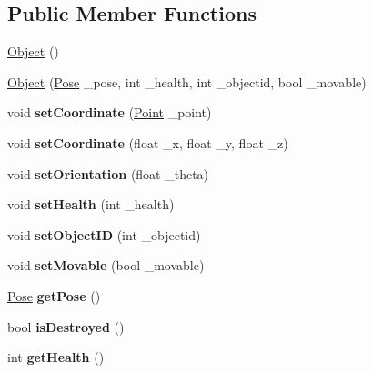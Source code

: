 \subsection*{Public Member Functions}
\begin{DoxyCompactItemize}
\item 
\hyperlink{class_object_a40860402e64d8008fb42329df7097cdb}{Object} ()
\item 
\hyperlink{class_object_a4fa29a635815662790df5caf339f2283}{Object} (\hyperlink{class_pose}{Pose} \_\-pose, int \_\-health, int \_\-objectid, bool \_\-movable)
\item 
\hypertarget{class_object_a9916c124808dd5327ee9db651999ee5e}{
void {\bfseries setCoordinate} (\hyperlink{class_point}{Point} \_\-point)}
\label{class_object_a9916c124808dd5327ee9db651999ee5e}

\item 
\hypertarget{class_object_aec5919a308227be70d7a830352dad309}{
void {\bfseries setCoordinate} (float \_\-x, float \_\-y, float \_\-z)}
\label{class_object_aec5919a308227be70d7a830352dad309}

\item 
\hypertarget{class_object_a2d8021509bbfad53a64500945e96ab77}{
void {\bfseries setOrientation} (float \_\-theta)}
\label{class_object_a2d8021509bbfad53a64500945e96ab77}

\item 
\hypertarget{class_object_a2c0c764d747737cdddc921c7f7434e0c}{
void {\bfseries setHealth} (int \_\-health)}
\label{class_object_a2c0c764d747737cdddc921c7f7434e0c}

\item 
\hypertarget{class_object_abd55d1176506de26480c149cea2e4e80}{
void {\bfseries setObjectID} (int \_\-objectid)}
\label{class_object_abd55d1176506de26480c149cea2e4e80}

\item 
\hypertarget{class_object_a731feebfbf40bc85e3ebaa6fdec42cf5}{
void {\bfseries setMovable} (bool \_\-movable)}
\label{class_object_a731feebfbf40bc85e3ebaa6fdec42cf5}

\item 
\hypertarget{class_object_a686a8f78bf82a31ebfd1fbbc3a949c1f}{
\hyperlink{class_pose}{Pose} {\bfseries getPose} ()}
\label{class_object_a686a8f78bf82a31ebfd1fbbc3a949c1f}

\item 
\hypertarget{class_object_a5d93664b6f77c6581757f201e59f9e3c}{
bool {\bfseries isDestroyed} ()}
\label{class_object_a5d93664b6f77c6581757f201e59f9e3c}

\item 
\hypertarget{class_object_a4be5c0a55f1bb5becf04dc42227bfa8f}{
int {\bfseries getHealth} ()}
\label{class_object_a4be5c0a55f1bb5becf04dc42227bfa8f}

\end{DoxyCompactItemize}


